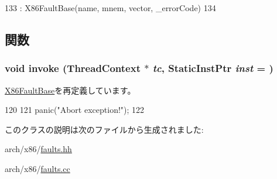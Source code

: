 \begin{DoxyCode}
133             : X86FaultBase(name, mnem, vector, _errorCode)
134         {}
\end{DoxyCode}


\subsection{関数}
\hypertarget{classX86ISA_1_1X86Abort_a2bd783b42262278d41157d428e1f8d6f}{
\subsubsection[{invoke}]{\setlength{\rightskip}{0pt plus 5cm}void invoke ({\bf ThreadContext} $\ast$ {\em tc}, \/  {\bf StaticInstPtr} {\em inst} = {})}}
\label{classX86ISA_1_1X86Abort_a2bd783b42262278d41157d428e1f8d6f}


\hyperlink{classX86ISA_1_1X86FaultBase_a2bd783b42262278d41157d428e1f8d6f}{X86FaultBase}を再定義しています。


\begin{DoxyCode}
120     {
121         panic("Abort exception!");
122     }
\end{DoxyCode}


このクラスの説明は次のファイルから生成されました:\begin{DoxyCompactItemize}
\item 
arch/x86/\hyperlink{arch_2x86_2faults_8hh}{faults.hh}\item 
arch/x86/\hyperlink{arch_2x86_2faults_8cc}{faults.cc}\end{DoxyCompactItemize}
